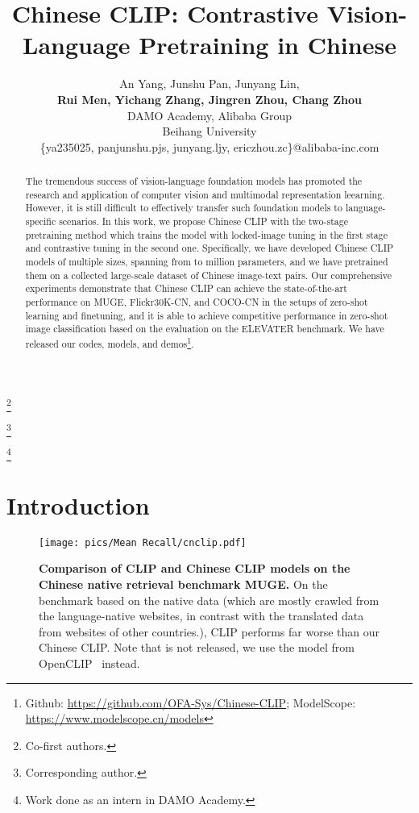 \documentclass[11pt]{article}
\title{Chinese CLIP: Contrastive Vision-Language Pretraining in Chinese}
\author{An Yang, Junshu Pan, Junyang Lin, \\
\textbf{Rui Men, Yichang Zhang, Jingren Zhou, Chang Zhou } \\
DAMO Academy, Alibaba Group \\ 
Beihang University \\
\{ya235025, panjunshu.pjs, junyang.ljy, ericzhou.zc\}@alibaba-inc.com
}
\begin{document}
\maketitle
\newcommand\blfootnote[1]{\begingroup
\renewcommand\thefootnote{}\footnote{#1}\addtocounter{footnote}{-1}\endgroup
}
\blfootnote{Co-first authors.}
\blfootnote{Corresponding author. }
\blfootnote{Work done as an intern in DAMO Academy.}

\begin{abstract}
The tremendous success of vision-language foundation models has promoted the research and application of computer vision and multimodal representation leearning. 
However, it is still difficult to effectively transfer such foundation models to language-specific scenarios. 
In this work, we propose Chinese CLIP with the two-stage pretraining method which trains the model with locked-image tuning in the first stage and contrastive tuning in the second one. 
Specifically, we have developed  Chinese CLIP models of multiple sizes, spanning from  to  million parameters, and we have pretrained them on a collected large-scale dataset of Chinese image-text pairs. 
Our comprehensive experiments demonstrate that Chinese CLIP can achieve the state-of-the-art performance on MUGE, Flickr30K-CN, and COCO-CN in the setups of zero-shot learning and finetuning, and it is able to achieve competitive performance in zero-shot image classification based on the evaluation on the ELEVATER benchmark. 
We have released our codes, models, and demos\footnote{Github: \url{https://github.com/OFA-Sys/Chinese-CLIP}; ModelScope: \url{https://www.modelscope.cn/models}}. 
\end{abstract}

\section{Introduction}


\begin{figure}[t] 
    \centering
    \texttt{[image: pics/Mean Recall/cnclip.pdf]}
    \caption{\textbf{Comparison of CLIP and Chinese CLIP models on the Chinese native retrieval benchmark MUGE.} On the benchmark based on the native data (which are mostly crawled from the language-native websites, in contrast with the translated data from websites of other countries.), CLIP performs far worse than our Chinese CLIP. Note that  is not released, we use the model from OpenCLIP~\citep{openclip} instead.}
    \label{fig:comparison}
\end{figure}
\end{document}
